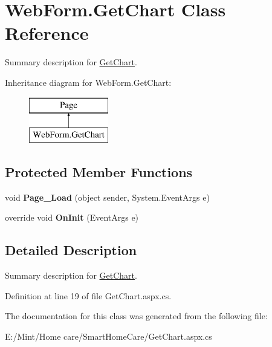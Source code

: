 \hypertarget{class_web_form_1_1_get_chart}{\section{Web\-Form.\-Get\-Chart Class Reference}
\label{class_web_form_1_1_get_chart}
}


Summary description for \hyperlink{class_web_form_1_1_get_chart}{Get\-Chart}.  


Inheritance diagram for Web\-Form.\-Get\-Chart\-:\begin{figure}[H]
\begin{center}
\leavevmode
\includegraphics[height=2.000000cm]{class_web_form_1_1_get_chart}
\end{center}
\end{figure}
\subsection*{Protected Member Functions}
\begin{DoxyCompactItemize}
\item 
\hypertarget{class_web_form_1_1_get_chart_aed77cc171a1bed201a2de3eaee27d253}{void {\bfseries Page\-\_\-\-Load} (object sender, System.\-Event\-Args e)}\label{class_web_form_1_1_get_chart_aed77cc171a1bed201a2de3eaee27d253}

\item 
\hypertarget{class_web_form_1_1_get_chart_acb82a86b9d96cde0463edae04a877f03}{override void {\bfseries On\-Init} (Event\-Args e)}\label{class_web_form_1_1_get_chart_acb82a86b9d96cde0463edae04a877f03}

\end{DoxyCompactItemize}


\subsection{Detailed Description}
Summary description for \hyperlink{class_web_form_1_1_get_chart}{Get\-Chart}. 



Definition at line 19 of file Get\-Chart.\-aspx.\-cs.



The documentation for this class was generated from the following file\-:\begin{DoxyCompactItemize}
\item 
E\-:/\-Mint/\-Home care/\-Smart\-Home\-Care/Get\-Chart.\-aspx.\-cs\end{DoxyCompactItemize}
